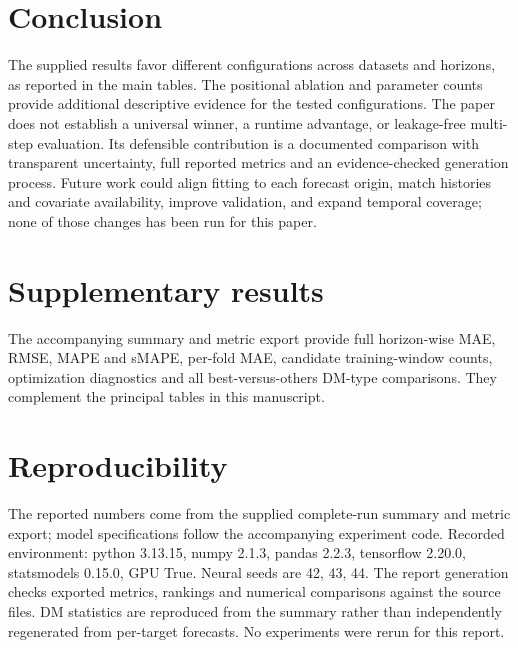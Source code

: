 \documentclass[10pt,a4paper]{article}
\begin{document}
\section{Conclusion}
The supplied results favor different configurations across datasets and horizons, as reported in the main tables. The positional ablation and parameter counts provide additional descriptive evidence for the tested configurations. The paper does not establish a universal winner, a runtime advantage, or leakage-free multi-step evaluation. Its defensible contribution is a documented comparison with transparent uncertainty, full reported metrics and an evidence-checked generation process. Future work could align fitting to each forecast origin, match histories and covariate availability, improve validation, and expand temporal coverage; none of those changes has been run for this paper.

\section*{Supplementary results}
The accompanying summary and metric export provide full horizon-wise MAE, RMSE, MAPE and sMAPE, per-fold MAE, candidate training-window counts, optimization diagnostics and all best-versus-others DM-type comparisons. They complement the principal tables in this manuscript.

\section{Reproducibility}
The reported numbers come from the supplied complete-run summary and metric export; model specifications follow the accompanying experiment code. Recorded environment: python 3.13.15, numpy 2.1.3, pandas 2.2.3, tensorflow 2.20.0, statsmodels 0.15.0, GPU True. Neural seeds are 42, 43, 44. The report generation checks exported metrics, rankings and numerical comparisons against the source files. DM statistics are reproduced from the summary rather than independently regenerated from per-target forecasts. No experiments were rerun for this report.
\end{document}
